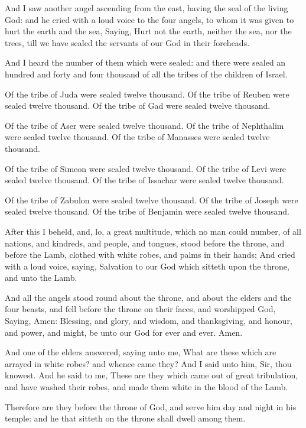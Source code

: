 \Verse And I saw another angel ascending from the east, having the seal of the living God: and he cried with a loud voice to the four angels, to whom it was given to hurt the earth and the sea, \Verse Saying, Hurt not the earth, neither the sea, nor the trees, till we have sealed the servants of our God in their foreheads.

\Verse And I heard the number of them which were sealed: and there were sealed an hundred and forty and four thousand of all the tribes of the children of Israel.

\Verse Of the tribe of Juda were sealed twelve thousand. Of the tribe of Reuben were sealed twelve thousand. Of the tribe of Gad were sealed twelve thousand.

\Verse Of the tribe of Aser were sealed twelve thousand. Of the tribe of Nephthalim were sealed twelve thousand. Of the tribe of Manasses were sealed twelve thousand.

\Verse Of the tribe of Simeon were sealed twelve thousand. Of the tribe of Levi were sealed twelve thousand. Of the tribe of Issachar were sealed twelve thousand.

\Verse Of the tribe of Zabulon were sealed twelve thousand. Of the tribe of Joseph were sealed twelve thousand. Of the tribe of Benjamin were sealed twelve thousand.

\Verse After this I beheld, and, lo, a great multitude, which no man could number, of all nations, and kindreds, and people, and tongues, stood before the throne, and before the Lamb, clothed with white robes, and palms in their hands; \Verse And cried with a loud voice, saying, Salvation to our God which sitteth upon the throne, and unto the Lamb.

\Verse And all the angels stood round about the throne, and about the elders and the four beasts, and fell before the throne on their faces, and worshipped God, \Verse Saying, Amen: Blessing, and glory, and wisdom, and thanksgiving, and honour, and power, and might, be unto our God for ever and ever. Amen.

\Verse And one of the elders answered, saying unto me, What are these which are arrayed in white robes? and whence came they?  \Verse And I said unto him, Sir, thou knowest. And he said to me, These are they which came out of great tribulation, and have washed their robes, and made them white in the blood of the Lamb.

\Verse Therefore are they before the throne of God, and serve him day and night in his temple: and he that sitteth on the throne shall dwell among them.


